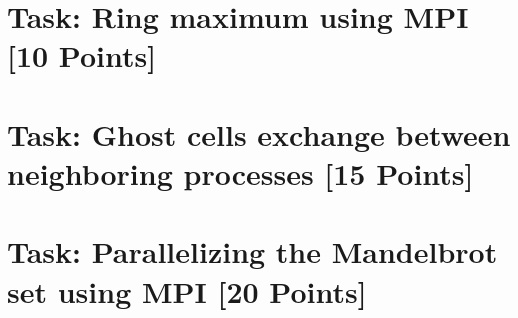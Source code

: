 \documentclass[unicode,11pt,a4paper,oneside,numbers=endperiod,openany]{scrartcl}
\begin{document}
\setassignment

\newline

\assignmentpolicy


\section{Task: Ring maximum using MPI [10 Points]}


\section{Task: Ghost cells exchange between neighboring processes [15 Points]}


\section{Task: Parallelizing the Mandelbrot set using MPI [20 Points]}



\end{document}
